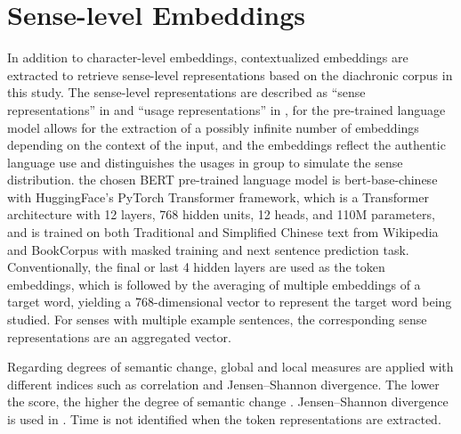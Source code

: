 \section{Sense-level Embeddings}
In addition to character-level embeddings, contextualized embeddings are extracted to retrieve sense-level representations based on the diachronic corpus in this study. The sense-level representations are described as ``sense representations'' in \textcite{hu2019diachronic} and ``usage representations'' in \textcite{giulianelli2019lexical}, for the pre-trained language model allows for the extraction of a possibly infinite number of embeddings depending on the context of the input, and the embeddings reflect the authentic language use and distinguishes the usages in group to simulate the sense distribution. the chosen BERT pre-trained language model is bert-base-chinese \parencite{devlin2018bert} with HuggingFace's PyTorch Transformer framework, which is a Transformer architecture with 12 layers, 768 hidden units, 12 heads, and 110M parameters, and is trained on both Traditional and Simplified Chinese text from Wikipedia and BookCorpus with masked training and next sentence prediction task. Conventionally, the final or last 4 hidden layers are used as the token embeddings, which is followed by the averaging of multiple embeddings of a target word, yielding a 768-dimensional vector to represent the target word being studied. For senses with multiple example sentences, the corresponding sense representations are an aggregated vector.

Regarding degrees of semantic change, global and local measures are applied with different indices such as correlation and Jensen–Shannon divergence. The lower the score, the higher the degree of semantic change \parencite{hamilton2016law}. Jensen–Shannon divergence is used in \textcite{giulianelli2019lexical}. Time is not identified when the token representations are extracted.

